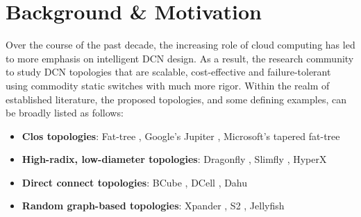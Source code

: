 \documentclass[sigconf]{acmart}
\theoremstyle{definition}
\begin{document}
\section{Background \& Motivation}\label{section_background}

Over the course of the past decade, the increasing role of cloud computing has led to more emphasis on intelligent DCN design. As a result, the research community to study DCN topologies that are scalable, cost-effective and failure-tolerant using commodity static switches with much more rigor. Within the realm of established literature, the proposed topologies, and some defining examples, can be broadly listed as follows: 
\begin{itemize}
    \item \textbf{Clos topologies}: Fat-tree \cite{al2008scalable}, Google's Jupiter \cite{singh2015jupiter}, Microsoft's tapered fat-tree \cite{liu2013f10, greenberg2009vl2}
    \item \textbf{High-radix, low-diameter topologies}: Dragonfly \cite{kim2008dragonfly, teh2017design}, Slimfly \cite{besta2014slim}, HyperX \cite{ahn2009hyperx}
    \item \textbf{Direct connect topologies}: BCube \cite{guo2009bcube}, DCell \cite{guo2008dcell}, Dahu \cite{radhakrishnan2013dahu}
    \item \textbf{Random graph-based topologies}: Xpander \cite{valadarsky2015xpander}, S2 \cite{yu2016space}, Jellyfish \cite{singla2012jellyfish}
\end{itemize}
\end{document}
